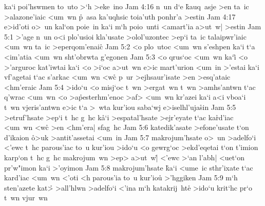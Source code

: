 ka`i
poi'hswmen
to~uto
>`h
>eke~ino\bibvsend
\vs Jam 4:16
n~un
d`e
\r{k}auq~asje
>en
ta~ic
>alazone'iaic
<um~wn
\r{p}~asa
ka'uqhsic
toia'uth
ponhr'a
>estin\bibvsend
\vs Jam 4:17
e>id'oti
o>~un
kal`on
poie~in
ka`i
m`h
poio~unti
<amart'ia
a>ut~w|
>estin\bibvsend
\vs Jam 5:1
>'age
n~un
o<i
plo'usioi
kla'usate
>olol'uzontec
>ep`i
ta~ic
talaipwr'iaic
<um~wn
ta~ic
>eperqom'enai\r{c}\bibvsend
{}
\vs Jam 5:2
<o
plo~utoc
<um~wn
s'eshpen
ka`i
t`a
<im'atia
<um~wn
sht'obrwta
g'egonen\bibvsend
\vs Jam 5:3
<o
qrus`oc
<um~wn
ka`i\r{}
<o
>'arguroc
kat'iwtai
ka`i
<o
>i`oc
a>ut~wn
e>ic
mart'urion
<um~in
>'estai
ka`i
vf'agetai
t`ac
s'arkac
<um~wn
<w\r{c}
p~ur
>ejhsaur'isate
>en
>esq'ataic
<hm'eraic\bibvsend
\vs Jam 5:4
>ido`u
<o
misj`oc
t~wn
>ergat~wn
t~wn
>amhs'antwn
t`ac
q'wrac
<um~wn
<o
>a\r{p}esterhm'enoc
>af>
<um~wn
kr'azei
ka`i
a<i
vboa`i
t~wn
vjeris'antwn
e>ic
t`a
>~wta
kur'iou
saba`wj
e>iselhl'uja\r{s}in\bibvsend
{}
\vs Jam 5:5
>etruf'hsate
>ep`i
t~hc
g~hc
k\r{a}`i
>espatal'hsate
>ejr'eyate
t`ac
ka\r{r}d'iac
<um~wn
<w\r{c}
>en
<hm'era|
sfag~hc\bibvsend
\vs Jam 5:6
katedik'asate
>efone'usate
t`on
d'ikaion
\r{o}>uk
>antit'assetai
<um~in\bibvsend
\vs Jam 5:7
makrojum'hsate
o>~un
>adelfo`i
<'ewc
t~hc
parous'iac
to~u
kur'iou
>ido`u
<o
gewrg`oc
>ekd'eqetai
t`on
t'imion
karp`on
t~hc
g~hc
makrojum~wn
>ep>
a>ut~w|\r{}
<'ewc
>`an
l'abh|
<uet`on
pr'w"imon
ka`i
>'oyimon\bibvsend
\vs Jam 5:8
makrojum'hsate
\r{k}a`i
<ume~ic
sthr'ixate
t`ac
kard'iac
<um~wn
<'oti
<h
parous'ia
to~u
kur'io\r{u}
>'hggiken\bibvsend
\vs Jam 5:9
m`h
sten'azete
kat>\r{}
>all'hlwn
>adelfo`i
<'ina
m`h
katakrij~hte\r{}
>ido`u
krit`hc
pr`o
t~wn
vjur~wn

